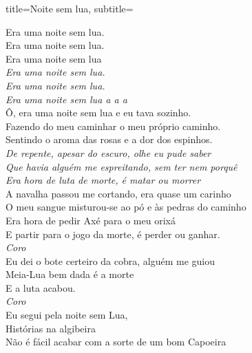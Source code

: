 \documentclass[fontsize=14pt, paper=a4, twoside, DIV=20]{scrreprt} %
\begin{document}
\begin{multicols*}{2}
\columnbreak
\begin{song}{title={Noite sem lua}, subtitle={\begin{small}
\end{small}}}

       {\small \begin{verse*}
            Era uma noite sem lua.\\
            Era uma noite sem lua.\\
            Era uma noite sem lua\\
            \textit{Era uma noite sem lua.\\
            Era uma noite sem lua.\\
            Era uma noite sem lua a a a}\\

            Ô, era uma noite sem lua e eu tava sozinho.\\
            Fazendo do meu caminhar o meu próprio caminho.\\
            Sentindo o aroma das rosas e a dor dos espinhos.\\

            \textit{
            De repente, apesar do escuro, olhe eu pude saber\\
            Que havia alguém me espreitando, sem ter nem porquê\\
            Era hora de luta de morte, é matar ou morrer}\\

            A navalha passou me cortando, era quase um carinho\\
            O meu sangue misturou-se ao pó e às pedras do caminho\\
            Era hora de pedir Axé para o meu orixá\\
            E partir para o jogo da morte, é perder ou ganhar.\\

            \textit{Coro}\\
            Eu dei o bote certeiro da cobra, alguém me guiou\\
            Meia-Lua bem dada é a morte\\
            E a luta acabou.\\

            \textit{Coro}\\
            Eu segui pela noite sem Lua,\\
            Histórias na algibeira\\
            Não é fácil acabar com a sorte de um bom Capoeira\\


\end{verse*}}
\end{song}
\end{multicols*}
\end{document}
